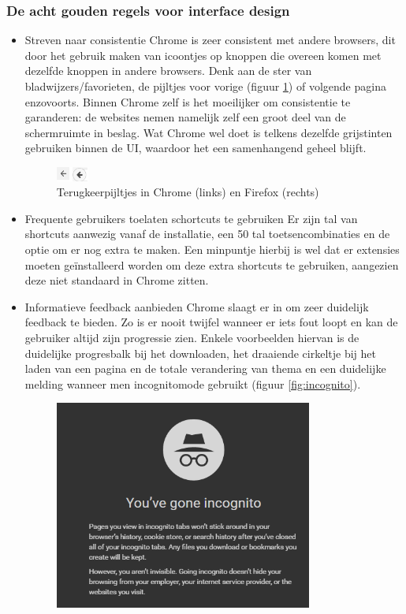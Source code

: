 \documentclass[12pt]{article}
\begin{document}
\subsubsection{De acht gouden regels voor interface design}
\begin{itemize}
	\item Streven naar consistentie
	\newline
	Chrome is zeer consistent met andere browsers, dit door het gebruik maken van icoontjes op knoppen die overeen komen met dezelfde knoppen in andere browsers. Denk aan de ster van bladwijzers/favorieten, de pijltjes voor vorige (figuur \ref{fig:back}) of volgende pagina enzovoorts. Binnen Chrome zelf is het moeilijker om consistentie te garanderen: de websites nemen namelijk zelf een groot deel van de schermruimte in beslag. Wat Chrome wel doet is telkens dezelfde grijstinten gebruiken binnen de UI, waardoor het een samenhangend geheel blijft.
	\begin{figure}
		\centering
		\includegraphics[width=0.1\textwidth]{back.png}
		\caption{Terugkeerpijltjes in Chrome (links) en Firefox (rechts)}
		\label{fig:back}
	\end{figure}
	\item Frequente gebruikers toelaten schortcuts te gebruiken
	\newline
	Er zijn tal van shortcuts aanwezig vanaf de installatie, een 50 tal toetsencombinaties\cite{shortcuts} en de optie om er nog extra te maken. Een minpuntje hierbij is wel dat er extensies moeten ge\"installeerd worden om deze extra shortcuts te gebruiken, aangezien deze niet standaard in Chrome zitten.
	\item Informatieve feedback aanbieden
	\newline
	Chrome slaagt er in om zeer duidelijk feedback te bieden. Zo is er nooit twijfel wanneer er iets fout loopt en kan de gebruiker altijd zijn progressie zien. Enkele voorbeelden hiervan is de duidelijke progresbalk bij het downloaden, het draaiende cirkeltje bij het laden van een pagina en de totale verandering van thema en een duidelijke melding wanneer men incognitomode gebruikt (figuur \ref{fig:incognito}).
	\newpage
	\begin{figure}
		\centering
		\includegraphics[width=0.8\textwidth]{incognito.png}

\end{figure}
\end{itemize}
\end{document}
